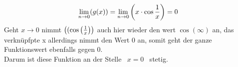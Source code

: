 \documentclass[a4paper,12pt]{article}
\begin{document}
\begin{enumerate}
                $$\underset{n \to 0}{\lim} (g(x)) = \underset{n \to 0}{\lim} \left(x \cdot \cos\frac{1}{x}\right) = 0 $$
                Geht $x \rightarrow 0$ nimmt $\left((\cos\left(\frac{1}{x}\right)\right)$ auch hier wieder den wert 
                $\cos(\infty)$ an, das verknüpfpte x allerdings nimmt den Wert 0 an, somit geht der ganze Funktionswert ebenfalls gegen 0. \\ Darum ist diese Funktion an der Stelle \ $x = 0$ \ stetig.


	\end{enumerate}
\end{document}
